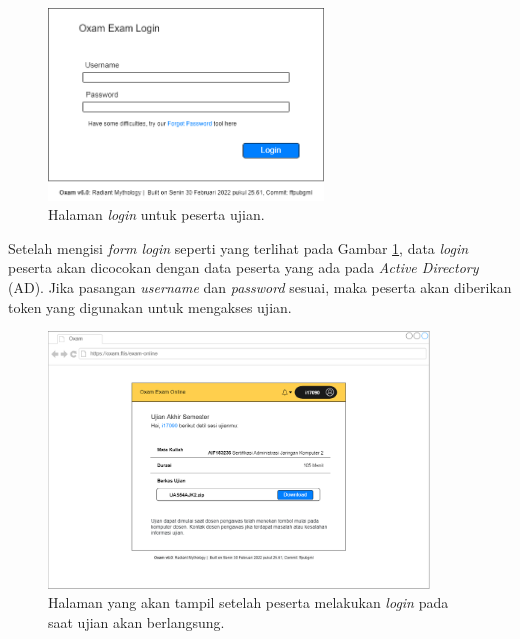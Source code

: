 \documentclass[a4paper,twoside]{article}
\begin{document}
\begin{enumerate}
\begin{itemize}
\begin{itemize}
                \begin{figure}[H]
                    \centering
                    \includegraphics[width=0.65\textwidth]{images/ui designs/exam-online/login-2.png}
                    \caption{Halaman \textit{login} untuk peserta ujian.}
                    \label{fig:exam-online-login}
                \end{figure}
                
		        \setlength\parindent{24pt}
		        Setelah mengisi \textit{form login} seperti yang terlihat pada Gambar \ref{fig:exam-online-login}, data \textit{login} peserta akan dicocokan dengan data peserta yang ada pada \textit{Active Directory} (AD). Jika pasangan \textit{username} dan \textit{password} sesuai, maka peserta akan diberikan token yang digunakan untuk mengakses ujian.
		        
		        
                \begin{figure}[H]
                    \centering
                    \includegraphics[width=0.9\textwidth]{images/ui designs/exam-online/exam-logged-in.png}
                    \caption{Halaman yang akan tampil setelah peserta melakukan \textit{login} pada saat ujian akan berlangsung. }
                    \label{fig:exam-online-logged-in}
                \end{figure}
		        

\end{itemize}
\end{itemize}
\end{enumerate}
\end{document}
